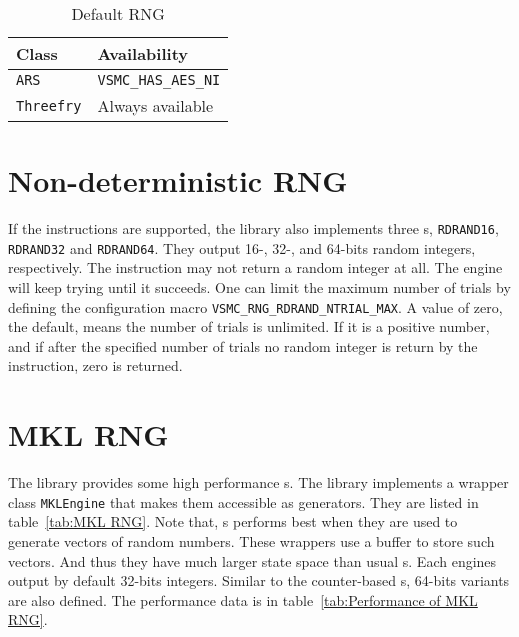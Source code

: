 \begin{table}
  \begin{tabularx}{\textwidth}{XX}
    \toprule
    Class & Availability \\
    \midrule
    \verb|ARS|      & \verb|VSMC_HAS_AES_NI| \\
    \verb|Threefry| & Always available       \\
    \bottomrule
  \end{tabularx}
  \caption{Default RNG}
  \label{tab:Default RNG}
\end{table}

\section{Non-deterministic RNG}
\label{sec:Non-deterministic RNG}

If the \rdrand instructions are supported, the library also implements three
\rng{}s, \verb|RDRAND16|, \verb|RDRAND32| and \verb|RDRAND64|. They output 16-,
32-, and 64-bits random integers, respectively. The \rdrand instruction may not
return a random integer at all. The \rng engine will keep trying until it
succeeds. One can limit the maximum number of trials by defining the
configuration macro \verb|VSMC_RNG_RDRAND_NTRIAL_MAX|. A value of zero, the
default, means the number of trials is unlimited. If it is a positive number,
and if after the specified number of trials no random integer is return by the
\rdrand instruction, zero is returned.

\section{MKL RNG}
\label{sec:MKL RNG}

The \mkl library provides some high performance \rng{}s. The library implements
a wrapper class \verb|MKLEngine| that makes them accessible as \cppoo{}
generators. They are listed in table~\ref{tab:MKL RNG}. Note that, \mkl{}
\rng{}s performs best when they are used to generate vectors of random numbers.
These wrappers use a buffer to store such vectors. And thus they have much
larger state space than usual \rng{}s. Each \rng engines output by default
32-bits integers. Similar to the counter-based \rng{}s, 64-bits variants are
also defined. The performance data is in table~\ref{tab:Performance of MKL
  RNG}.

